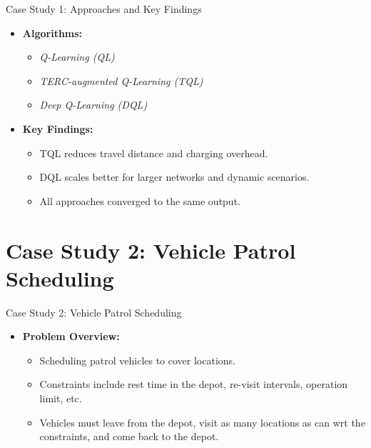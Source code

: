 \documentclass{beamer}
\begin{document}
\begin{frame}{Case Study 1: Approaches and Key Findings}
  \begin{itemize}[<+->]
    \item \textbf{Algorithms:}
      \begin{itemize}[<+->]
        \item \emph{Q-Learning (QL)}
        \item \emph{TERC-augmented Q-Learning (TQL)}
        \item \emph{Deep Q-Learning (DQL)}
      \end{itemize}
    \item \textbf{Key Findings:}
      \begin{itemize}[<+->]
        \item TQL reduces travel distance and charging overhead.
        \item DQL scales better for larger networks and dynamic scenarios.
        \item All approaches converged to the same output.
      \end{itemize}
  \end{itemize}
\end{frame}

\section{Case Study 2: Vehicle Patrol Scheduling}
\begin{frame}{Case Study 2: Vehicle Patrol Scheduling}
  \begin{itemize}[<+->]
    \item \textbf{Problem Overview:}
      \begin{itemize}[<+->]
        \item Scheduling patrol vehicles to cover locations.
        \item Constraints include rest time in the depot, re-visit intervals, operation limit, etc.
        \item Vehicles must leave from the depot, visit as many locations as can wrt the constraints, and come back to the depot.
      \end{itemize}
  \end{itemize}
\end{frame}
\end{document}
